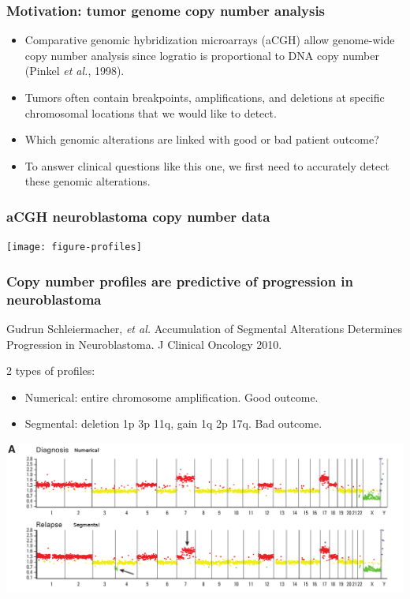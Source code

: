 \documentclass{beamer}
\begin{document}
\begin{frame}
  \frametitle{Motivation: tumor genome copy number analysis}
  \begin{itemize}
  \item Comparative genomic hybridization microarrays (aCGH) allow
    genome-wide copy number analysis since logratio is proportional to
    DNA copy number (Pinkel \emph{et al.}, 1998).
  \item Tumors often contain breakpoints, amplifications, and
    deletions at specific chromosomal locations that we would like to
    detect.
  \item Which genomic alterations are linked with good or bad patient
    outcome?
  \item To answer clinical questions like this one, we first need to
    accurately detect these genomic alterations.
  \end{itemize}
\end{frame}

\begin{frame}
  \frametitle{aCGH neuroblastoma copy number data}
  
  \texttt{[image: figure-profiles]}
  
\end{frame}


\begin{frame}
  \frametitle{Copy number profiles are predictive of progression in
    neuroblastoma}
  
  Gudrun Schleiermacher, \emph{et al.} Accumulation of Segmental
  Alterations Determines Progression in Neuroblastoma. J Clinical
  Oncology 2010.

  2 types of profiles:
  
  \begin{itemize}
  \item Numerical: entire chromosome amplification. \alert{Good}
    outcome.
  \item Segmental: deletion 1p 3p 11q, gain 1q 2p 17q. \alert{Bad}
    outcome. 
  \end{itemize}
  \includegraphics[width=\textwidth]{numerical-segmental}
  
\end{frame}
\end{document}
